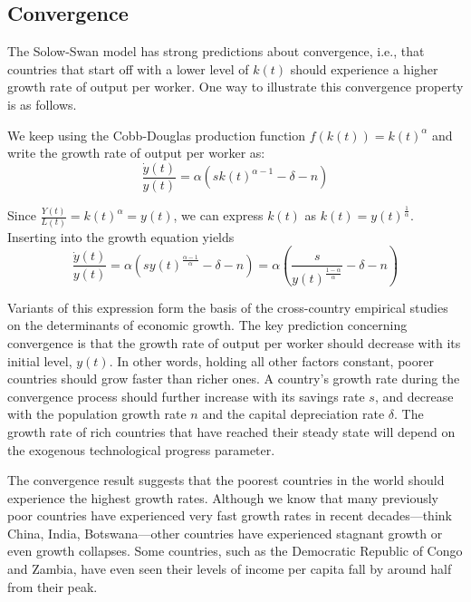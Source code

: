 \documentclass[\topdir/lecture\_notes.tex]{subfiles}
\begin{document}
\subsection{Convergence}
The Solow-Swan model has strong predictions about convergence, i.e., that countries that start off with a lower level of \(k(t)\) should experience a higher growth rate of output per worker.
One way to illustrate this convergence property is as follows.

We keep using the Cobb-Douglas production function \(f(k(t))=k(t)^{\alpha}\) and write the growth rate of output per worker as:
\begin{equation}
  \frac{\dot{y}(t)}{y(t)}=\alpha\left(s k(t)^{\alpha-1}-\delta-n\right)
  \label{eq:solow-convergence-growth}
\end{equation}

Since \(\frac{Y(t)}{L(t)}=k(t)^{\alpha}=y(t)\), we can express \(k(t)\) as \(k(t)=y(t)^{\frac{1}{\alpha}}\).
Inserting into the growth equation yields
\begin{equation}
  \frac{\dot{y}(t)}{y(t)}=\alpha\left(s y(t)^{\frac{\alpha-1}{\alpha}}-\delta-n\right)=\alpha\left(\frac{s}{y(t)^{\frac{1-\alpha}{\alpha}}}-\delta-n\right)
  \label{eq:solow-convergence-y}
\end{equation}

Variants of this expression form the basis of the cross-country empirical studies on the determinants of economic growth.
The key prediction concerning convergence is that the growth rate of output per worker should decrease with its initial level, \(y(t)\).
In other words, holding all other factors constant, poorer countries should grow faster than richer ones.
A country's growth rate during the convergence process should further increase with its savings rate \(s\), and decrease with the population growth rate \(n\) and the capital depreciation rate \(\delta\).
The growth rate of rich countries that have reached their steady state will depend on the exogenous technological progress parameter.

The convergence result suggests that the poorest countries in the world should experience the highest growth rates.
Although we know that many previously poor countries have experienced very fast growth rates in recent decades---think China, India, Botswana---other countries have experienced stagnant growth or even growth collapses.
Some countries, such as the Democratic Republic of Congo and Zambia, have even seen their levels of income per capita fall by around half from their peak.
\end{document}
